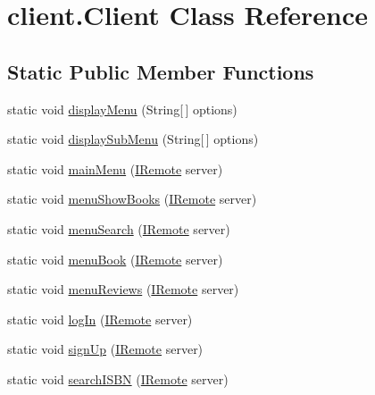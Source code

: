 \hypertarget{classclient_1_1_client}{}\section{client.\+Client Class Reference}
\label{classclient_1_1_client}
\subsection*{Static Public Member Functions}
\begin{DoxyCompactItemize}
\item 
static void \hyperlink{classclient_1_1_client_a54355debc9ffcc61540f7f39241a8a77}{display\+Menu} (String\mbox{[}$\,$\mbox{]} options)
\item 
static void \hyperlink{classclient_1_1_client_a53ffa5e1dd33232694d89f2011acc973}{display\+Sub\+Menu} (String\mbox{[}$\,$\mbox{]} options)
\item 
static void \hyperlink{classclient_1_1_client_abb4f93c11e43c61c21ac7f42a826964c}{main\+Menu} (\hyperlink{interfaceserver_1_1remote_1_1_i_remote}{I\+Remote} server)
\item 
static void \hyperlink{classclient_1_1_client_a5949234ea4d0f331260d4265c8de9967}{menu\+Show\+Books} (\hyperlink{interfaceserver_1_1remote_1_1_i_remote}{I\+Remote} server)
\item 
static void \hyperlink{classclient_1_1_client_aa705054047bb8f7fef9173a9f0980707}{menu\+Search} (\hyperlink{interfaceserver_1_1remote_1_1_i_remote}{I\+Remote} server)
\item 
static void \hyperlink{classclient_1_1_client_aa8fa722000df2208c9a3f4ac7092ea5e}{menu\+Book} (\hyperlink{interfaceserver_1_1remote_1_1_i_remote}{I\+Remote} server)
\item 
static void \hyperlink{classclient_1_1_client_ab5381c77d6c103c49fe3a876e711c318}{menu\+Reviews} (\hyperlink{interfaceserver_1_1remote_1_1_i_remote}{I\+Remote} server)
\item 
static void \hyperlink{classclient_1_1_client_aa9400681614784a26489a925cbdddb0a}{log\+In} (\hyperlink{interfaceserver_1_1remote_1_1_i_remote}{I\+Remote} server)
\item 
static void \hyperlink{classclient_1_1_client_a703b7a8ec73e49a2dafa18c0e99fc2f7}{sign\+Up} (\hyperlink{interfaceserver_1_1remote_1_1_i_remote}{I\+Remote} server)
\item 
static void \hyperlink{classclient_1_1_client_ab4d1b606d620956a59f70c4af4937cc1}{search\+I\+S\+BN} (\hyperlink{interfaceserver_1_1remote_1_1_i_remote}{I\+Remote} server)

\end{DoxyCompactItemize}
